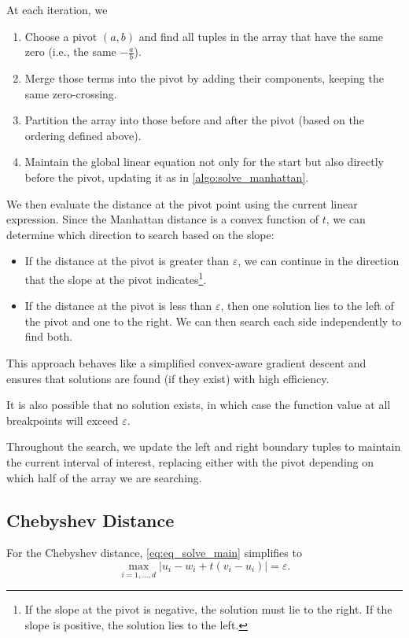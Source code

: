 At each iteration, we 
\begin{enumerate}
	\item Choose a pivot \((a, b)\)	and find all tuples in the array that have the same zero (i.e., the same \(-\frac{a}{b}\)).
	\item Merge those terms into the pivot by adding their components, keeping the same zero-crossing.
	\item Partition the array into those before and after the pivot (based on the ordering defined above).
	\item Maintain the global linear equation not only for the start but also directly before the pivot, updating it as in \cref{algo:solve_manhattan}.
\end{enumerate}

We then evaluate the distance at the pivot point using the current linear expression. Since the Manhattan distance is a convex function of \(t\), we can determine which direction to search based on the slope: 
\begin{itemize}
	\item If the distance at the pivot is greater than \(\varepsilon\), we can continue in the direction that the slope at the pivot indicates\footnote{If the slope at the pivot is negative, the solution must lie to the right. If the slope is positive, the solution lies to the left.}.
	\item If the distance at the pivot is less than \(\varepsilon\), then one solution lies to the left of the pivot and one to the right. We can then search each side independently to find both.
\end{itemize}

This approach behaves like a simplified convex-aware gradient descent and ensures that solutions are found (if they exist) with high efficiency. 

 It is also possible that no solution exists, in which case the function value at all breakpoints will exceed \(\varepsilon\). 

 Throughout the search, we update the left and right boundary tuples to maintain the current interval of interest, replacing either with the pivot depending on which half of the array we are searching. 

\subsection{Chebyshev Distance}
\label{subsubsec:eq_chebyshev_distance}
For the Chebyshev distance, \cref{eq:eq_solve_main} simplifies to 
\begin{equation}
  \max_{i = 1,\dots, d} |u_i - w_i + t(v_i - u_i)| = \varepsilon.\label{eq:solve_chebyshev}
\end{equation}

